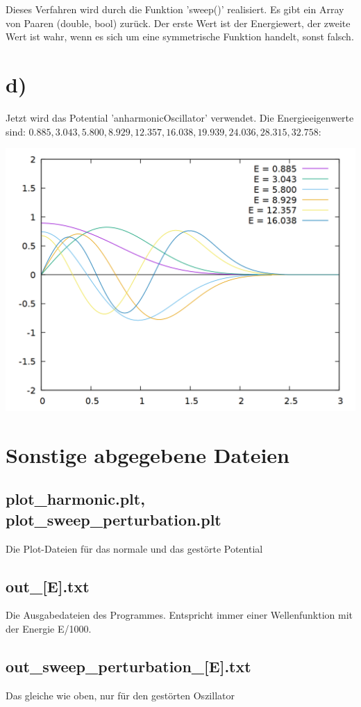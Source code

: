 \documentclass{scrreprt}
\begin{document}
Dieses Verfahren wird durch die Funktion 'sweep()' realisiert. Es gibt ein Array von Paaren (double, bool) zurück. Der erste Wert ist der Energiewert, der zweite Wert ist wahr, wenn es sich um eine symmetrische Funktion handelt, sonst falsch.

\section*{d)}
Jetzt wird das Potential 'anharmonicOscillator' verwendet. Die Energieeigenwerte sind: $0.885, 3.043, 5.800, 8.929, 12.357, 16.038, 19.939, 24.036, 28.315, 32.758$:

\begin{center}
\includegraphics[scale=0.3]{aufgabe3/plot_sweep_perturbation_cut.png}
\end{center}

\section*{Sonstige abgegebene Dateien}
\subsection*{plot\_harmonic.plt, plot\_sweep\_perturbation.plt}
Die Plot-Dateien für das normale und das gestörte Potential
\subsection*{out\_[E].txt}
Die Ausgabedateien des Programmes. Entspricht immer einer Wellenfunktion mit der Energie E/1000.
\subsection*{out\_sweep\_perturbation\_[E].txt}
Das gleiche wie oben, nur für den gestörten Oszillator
\end{document}
